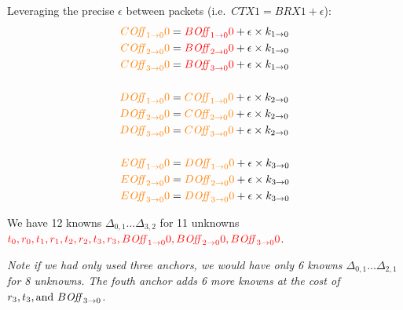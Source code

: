 \documentclass{article}
\begin{document}
Leveraging the precise $\epsilon$ between packets (i.e.\ $CTX1 = BRX1 + \epsilon$):
\begin{align}
\der{C\off{1}{0}0} &= \unk{B\off{1}{0}0} + \epsilon \times k_{1\rightarrow0} \\
\der{C\off{2}{0}0} &= \unk{B\off{2}{0}0} + \epsilon \times k_{1\rightarrow0} \\
\der{C\off{3}{0}0} &= \unk{B\off{3}{0}0} + \epsilon \times k_{1\rightarrow0} \\
~\nonumber\\
\der{D\off{1}{0}0} &= \der{C\off{1}{0}0} + \epsilon \times k_{2\rightarrow0} \\
\der{D\off{2}{0}0} &= \der{C\off{2}{0}0} + \epsilon \times k_{2\rightarrow0} \\
\der{D\off{3}{0}0} &= \der{C\off{3}{0}0} + \epsilon \times k_{2\rightarrow0} \\
~\nonumber\\
\der{E\off{1}{0}0} &= \der{D\off{1}{0}0} + \epsilon \times k_{3\rightarrow0} \\
\der{E\off{2}{0}0} &= \der{D\off{2}{0}0} + \epsilon \times k_{3\rightarrow0} \\
\der{E\off{3}{0}0} &= \der{D\off{3}{0}0} + \epsilon \times k_{3\rightarrow0}
\end{align}


We have 12 knowns $\Delta_{0,1} \dots \Delta_{3,2}$ for 11 unknowns
$\unk{t_0, r_0, t_1, r_1, t_2, r_2, t_3, r_3, B\off{1}{0}0, B\off{2}{0}0, B\off{3}{0}0}$.

\medskip
\noindent
\emph{Note if we had only used three anchors, we would have only 6 knowns
$\Delta_{0,1} \dots \Delta_{2,1}$ for 8 unknowns. The fouth anchor adds 6 more
knowns at the cost of $r_3, t_3, \textnormal{and}~B\off{3}{0}$.}
\end{document}
